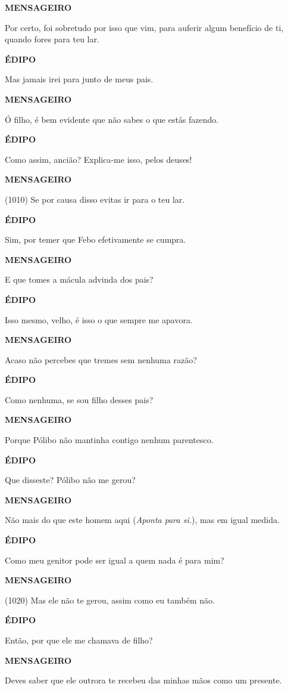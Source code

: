 \textbf{MENSAGEIRO}

Por certo, foi sobretudo por isso que vim, para auferir algum benefício
de ti, quando fores para teu lar.

\textbf{ÉDIPO}

Mas jamais irei para junto de meus pais.

\textbf{MENSAGEIRO}

Ó filho, é bem evidente que não sabes o que estás fazendo.

\textbf{ÉDIPO}

Como assim, ancião? Explica-me isso, pelos deuses!

\textbf{MENSAGEIRO}

(1010) Se por causa disso evitas ir para o teu lar.

\textbf{ÉDIPO}

Sim, por temer que Febo efetivamente se cumpra.

\textbf{MENSAGEIRO}

E que tomes a mácula advinda dos pais?

\textbf{ÉDIPO}

Isso mesmo, velho, é isso o que sempre me apavora.

\textbf{MENSAGEIRO}

Acaso não percebes que tremes sem nenhuma razão?

\textbf{ÉDIPO}

Como nenhuma, se sou filho desses pais?

\textbf{MENSAGEIRO}

Porque Pólibo não mantinha contigo nenhum parentesco.

\textbf{ÉDIPO}

Que disseste? Pólibo não me gerou?

\textbf{MENSAGEIRO}

Não mais do que este homem aqui (\emph{Aponta para si.}), mas em igual
medida.

\textbf{ÉDIPO}

Como meu genitor pode ser igual a quem nada é para mim?

\textbf{MENSAGEIRO}

(1020) Mas ele não te gerou, assim como eu também não.

\textbf{ÉDIPO}

Então, por que ele me chamava de filho?

\textbf{MENSAGEIRO}

Deves saber que ele outrora te recebeu das minhas mãos como um presente.

